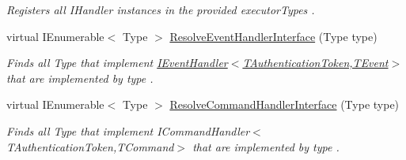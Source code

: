 \begin{DoxyCompactItemize}
\begin{DoxyCompactList}\small\item\em Registers all I\+Handler instances in the provided {\itshape executor\+Types} . \end{DoxyCompactList}\item 
virtual I\+Enumerable$<$ Type $>$ \hyperlink{classCqrs_1_1Configuration_1_1BusRegistrar_a0af1844a5f7f1c4adfde2499b054aaae_a0af1844a5f7f1c4adfde2499b054aaae}{Resolve\+Event\+Handler\+Interface} (Type type)
\begin{DoxyCompactList}\small\item\em Finds all Type that implement \hyperlink{interfaceCqrs_1_1Events_1_1IEventHandler}{I\+Event\+Handler$<$\+T\+Authentication\+Token,\+T\+Event$>$} that are implemented by {\itshape type} . \end{DoxyCompactList}\item 
virtual I\+Enumerable$<$ Type $>$ \hyperlink{classCqrs_1_1Configuration_1_1BusRegistrar_a0e118c57c7e804df1d810750befb25df_a0e118c57c7e804df1d810750befb25df}{Resolve\+Command\+Handler\+Interface} (Type type)
\begin{DoxyCompactList}\small\item\em Finds all Type that implement I\+Command\+Handler$<$\+T\+Authentication\+Token,\+T\+Command$>$ that are implemented by {\itshape type} . \end{DoxyCompactList}\end{DoxyCompactItemize}
